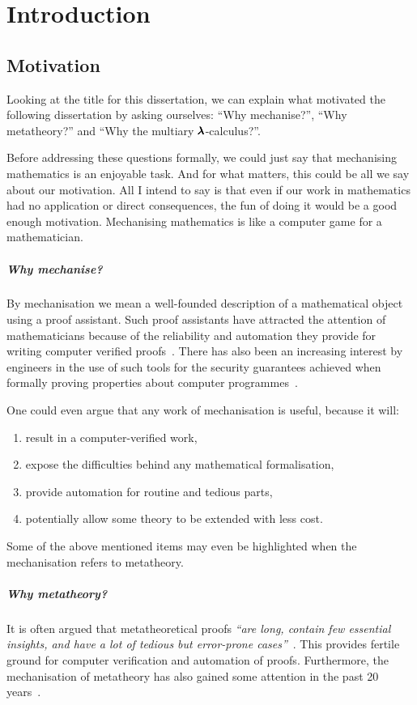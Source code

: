 \chapter{Introduction}
\label{c:intro}

\section{Motivation}
Looking at the title for this dissertation, we can explain what motivated the following dissertation by asking ourselves: ``Why mechanise?'', ``Why metatheory?'' and ``Why the multiary $\pmb{\lambda}$-calculus?''.

Before addressing these questions formally, we could just say that mechanising mathematics is an enjoyable task.
And for what matters, this could be all we say about our motivation.
All I intend to say is that even if our work in mathematics had no application or direct consequences, the fun of doing it would be a good enough motivation.
Mechanising mathematics is like a computer game for a mathematician.

\paragraph{Why mechanise?}
By mechanisation we mean a well-founded description of a mathematical object using a proof assistant.
Such proof assistants have attracted the attention of mathematicians because of the reliability and automation they provide for writing computer verified proofs~\cite{FourColourThm}.
There has also been an increasing interest by engineers in the use of such tools for the security guarantees achieved when formally proving properties about computer programmes~\cite{CompCert}.

One could even argue that any work of mechanisation is useful, because it will:
\begin{enumerate}
\item result in a computer-verified work,
\item expose the difficulties behind any mathematical formalisation,
\item provide automation for routine and tedious parts,
\item potentially allow some theory to be extended with less cost.
\end{enumerate}

Some of the above mentioned items may even be highlighted when the mechanisation refers to metatheory.

\paragraph{Why metatheory?}
It is often argued that metatheoretical proofs \textit{``are long, contain few essential insights, and have a lot of tedious but error-prone cases''}~\cite{AutosubstSchafer}.
This provides fertile ground for computer verification and automation of proofs.
Furthermore, the mechanisation of metatheory has also gained some attention in the past 20 years~\cite{POPLmark, POPLmarkReloaded}.

